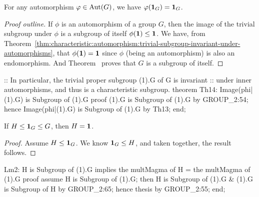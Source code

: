 \begin{theorem}
For any automorphism $\varphi\in\operatorname{Aut}(G)$, we have $\varphi(\mathbf{1}_{G})=\mathbf{1}_{G}$.
\end{theorem}

\begin{proof}[Proof outline]
If $\phi$ is an automorphism of a group $G$, then
the image of the trivial subgroup under $\phi$ is a subgroup of itself
$\phi(\mathbf{1})\leq\mathbf{1}$. We have, from
Theorem~\ref{thm:characteristic:automorphism:trivial-subgroup-invariant-under-automorphisms}, that $\phi(\mathbf{1})=\mathbf{1}$ since
$\phi$ (being an automorphism) is also an endomorphism. And
Theorem~
proves that $G$ is a subgroup of itself.
\end{proof}

\nwenddocs{}\endmoddef\nwstartdeflinemarkup{}\nwenddeflinemarkup
:: In particular, the trivial proper subgroup (1).G of G is invariant
:: under inner automorphisms, and thus is a characteristic subgroup.
theorem Th14:
  Image(phi|(1).G) is Subgroup of (1).G
proof
  (1).G is Subgroup of (1).G by GROUP_2:54;
  hence Image(phi|(1).G) is Subgroup of (1).G by Th13;
end;
\eatline
{}\nwendcode{}\nwdocspar
\begin{lemma}
If $H\leq\mathbf{1}_{G}\leq G$, then $H=\mathbf{1}$.
\end{lemma}

\begin{proof}
Assume $H\leq\mathbf{1}_{G}$. We know
$\mathbf{1}_{G}\leq H$, and taken together, the result follows.
\end{proof}

\nwenddocs{}\endmoddef\nwstartdeflinemarkup{}\nwenddeflinemarkup
Lm2: H is Subgroup of (1).G implies the multMagma of H = the multMagma of (1).G
proof
  assume H is Subgroup of (1).G;
  then H is Subgroup of (1).G & (1).G is Subgroup of H by GROUP_2:65;
  hence thesis by GROUP_2:55;
end;
\eatline
{}\nwendcode{}\nwdocspar

